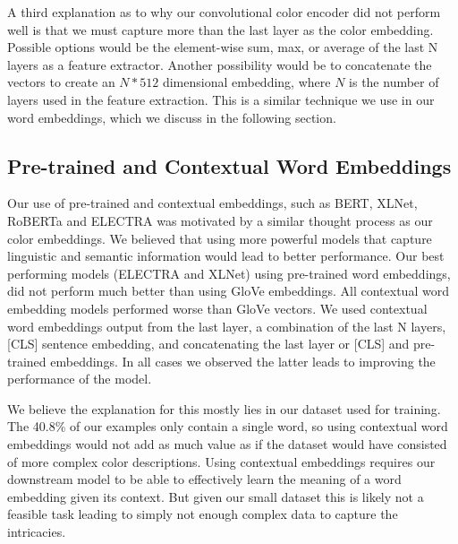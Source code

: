 \par
A third explanation as to why our convolutional color encoder did not perform well is that we must capture more than the last layer as the color embedding. Possible options would be the element-wise sum, max, or average of the last N layers as a feature extractor. Another possibility would be to concatenate the vectors to create an \(N*512\) dimensional embedding, where \(N\) is the number of layers used in the feature extraction. This is a similar technique we use in our word embeddings, which we discuss in the following section.

\subsection{Pre-trained and Contextual Word Embeddings}

Our use of pre-trained and contextual embeddings, such as BERT, XLNet, RoBERTa and ELECTRA was motivated by a similar thought process as our color embeddings. We believed that using more powerful models that capture linguistic and semantic information would lead to better performance. Our best performing models (ELECTRA and XLNet) using pre-trained word embeddings, did not perform much better than using GloVe embeddings. All contextual word embedding models performed worse than GloVe vectors. We used contextual word embeddings output from the last layer, a combination of the last N layers, [CLS] sentence embedding, and concatenating the last layer or [CLS] and pre-trained embeddings. In all cases we observed the latter leads to improving the performance of the model.

\par
We believe the explanation for this mostly lies in our dataset used for training. The 40.8\% of our examples only contain a single word, so using contextual word embeddings would not add as much value as if the dataset would have consisted of more complex color descriptions. Using contextual embeddings requires our downstream  model to be able to effectively learn the meaning of a word embedding given its context. But given our small dataset this is likely not a feasible task leading to simply not enough complex data to capture the intricacies.

